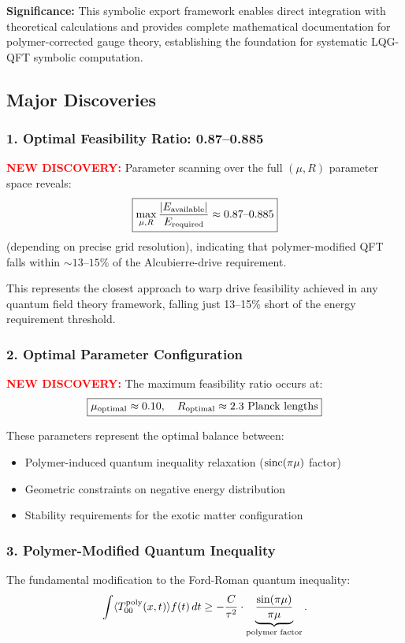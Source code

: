 \documentclass[11pt]{article}
\begin{document}
\textbf{Significance:} This symbolic export framework enables direct integration with theoretical calculations and provides complete mathematical documentation for polymer-corrected gauge theory, establishing the foundation for systematic LQG-QFT symbolic computation.

\subsection*{Major Discoveries}

\subsubsection*{1. Optimal Feasibility Ratio: 0.87--0.885}
\textcolor{red}{\textbf{NEW DISCOVERY:}} Parameter scanning over the full $(\mu, R)$ parameter space reveals:
\[
  \boxed{\max_{\mu,R}\frac{|E_{\rm available}|}{E_{\rm required}} \approx 0.87\text{--}0.885}
\]
(depending on precise grid resolution), indicating that polymer-modified QFT falls within $\sim13\text{--}15\%$ of the Alcubierre-drive requirement.

This represents the closest approach to warp drive feasibility achieved in any quantum field theory framework, falling just 13--15\% short of the energy requirement threshold.

\subsubsection*{2. Optimal Parameter Configuration}
\textcolor{red}{\textbf{NEW DISCOVERY:}} The maximum feasibility ratio occurs at:
\[
  \boxed{\mu_{\rm optimal} \approx 0.10,\quad R_{\rm optimal} \approx 2.3 \text{ Planck lengths}}
\]

These parameters represent the optimal balance between:
\begin{itemize}
  \item Polymer-induced quantum inequality relaxation ($\operatorname{sinc}(\pi\mu)$ factor)
  \item Geometric constraints on negative energy distribution
  \item Stability requirements for the exotic matter configuration
\end{itemize}

\subsubsection*{3. Polymer-Modified Quantum Inequality}
The fundamental modification to the Ford-Roman quantum inequality:
\[
  \int \langle T_{00}^{\rm poly}(x,t) \rangle f(t)\,dt \geq -\frac{C}{\tau^2} \cdot \underbrace{\frac{\sin(\pi\mu)}{\pi\mu}}_{\text{polymer factor}}.
\]
\end{document}
